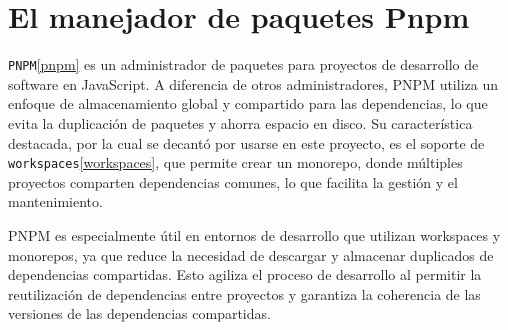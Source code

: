 \section{El manejador de paquetes Pnpm}

\verb|PNPM|\ref{pnpm} es un administrador de paquetes para proyectos de desarrollo de software en JavaScript. A diferencia de otros administradores, PNPM utiliza un enfoque de almacenamiento global y compartido para las dependencias, lo que evita la duplicación de paquetes y ahorra espacio en disco. Su característica destacada, por la cual se decantó por usarse en este proyecto, es el soporte de \verb|workspaces|\ref{workspaces}, que permite crear un monorepo, donde múltiples proyectos comparten dependencias comunes, lo que facilita la gestión y el mantenimiento.

PNPM es especialmente útil en entornos de desarrollo que utilizan workspaces y monorepos, ya que reduce la necesidad de descargar y almacenar duplicados de dependencias compartidas. Esto agiliza el proceso de desarrollo al permitir la reutilización de dependencias entre proyectos y garantiza la coherencia de las versiones de las dependencias compartidas.